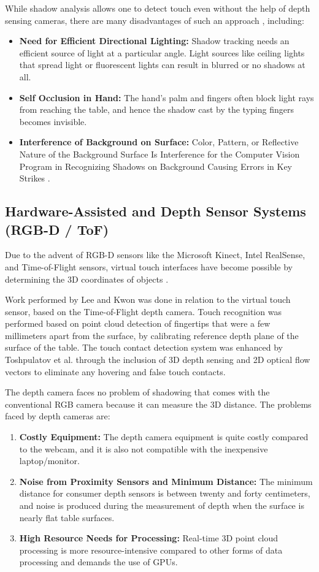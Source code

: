 While shadow analysis allows one to detect touch even without the help of depth sensing cameras, there are many disadvantages of such an approach \cite{Yue2014Blind}, including:
\begin{itemize}
    \item \textbf{Need for Efficient Directional Lighting:} Shadow tracking needs an efficient source of light at a particular angle. Light sources like ceiling lights that spread light or fluorescent lights can result in blurred or no shadows at all.
    \item \textbf{Self Occlusion in Hand:} The hand's palm and fingers often block light rays from reaching the table, and hence the shadow cast by the typing fingers becomes invisible.
    \item \textbf{Interference of Background on Surface:} Color, Pattern, or Reflective Nature of the Background Surface Is Interference for the Computer Vision Program in Recognizing Shadows on Background Causing Errors in Key Strikes \cite{Yue2014Blind}.
\end{itemize}

\subsection{Hardware-Assisted and Depth Sensor Systems (RGB-D / ToF)}
\label{subsec:lit_depth_systems}
Due to the advent of RGB-D sensors like the Microsoft Kinect, Intel RealSense, and Time-of-Flight sensors, virtual touch interfaces have become possible by determining the 3D coordinates of objects \cite{Lee2019Virtual, Toshpulatov2024RealTime}.

Work performed by Lee and Kwon \cite{Lee2019Virtual} was done in relation to the virtual touch sensor, based on the Time-of-Flight depth camera. Touch recognition was performed based on point cloud detection of fingertips that were a few millimeters apart from the surface, by calibrating reference depth plane of the surface of the table. The touch contact detection system was enhanced by Toshpulatov et al. \cite{Toshpulatov2024RealTime} through the inclusion of 3D depth sensing and 2D optical flow vectors to eliminate any hovering and false touch contacts.

The depth camera faces no problem of shadowing that comes with the conventional RGB camera because it can measure the 3D distance. The problems faced by depth cameras are:
\begin{enumerate}
    \item \textbf{Costly Equipment:} The depth camera equipment is quite costly compared to the webcam, and it is also not compatible with the inexpensive laptop/monitor.
    \item \textbf{Noise from Proximity Sensors and Minimum Distance:} The minimum distance for consumer depth sensors is between twenty and forty centimeters, and noise is produced during the measurement of depth when the surface is nearly flat table surfaces.
    \item \textbf{High Resource Needs for Processing:} Real-time 3D point cloud processing is more resource-intensive compared to other forms of data processing and demands the use of GPUs.
\end{enumerate}


